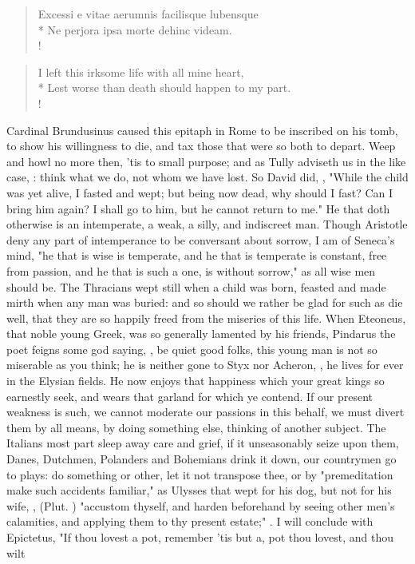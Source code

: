 {\begin{latin}%
\begin{verse}%
Excessi e vitae aerumnis facilisque lubensque\\*
Ne perjora ipsa morte dehinc videam.\\!
\end{verse}%
\end{latin}%
\translationrule%
\begin{verse}%
I left this irksome life with all mine heart,\\*
Lest worse than death should happen to my part.\\!
\end{verse}%

Cardinal Brundusinus caused this epitaph in Rome to be inscribed on his tomb, to show his willingness to die, and tax those that were so both to depart. Weep and howl no more then, 'tis to small purpose; and as Tully adviseth us in the like case, : think what we do, not whom we have lost. So David did, , "While the child was yet alive, I fasted and wept; but being now dead, why should I fast? Can I bring him again? I shall go to him, but he cannot return to me." He that doth otherwise is an intemperate, a weak, a silly, and indiscreet man. Though Aristotle deny any part of intemperance to be conversant about sorrow, I am of Seneca's mind, "he that is wise is temperate, and he that is temperate is constant, free from passion, and he that is such a one, is without sorrow," as all wise men should be. The Thracians wept still when a child was born, feasted and made mirth when any man was buried: and so should we rather be glad for such as die well, that they are so happily freed from the miseries of this life. When Eteoneus, that noble young Greek, was so generally lamented by his friends, Pindarus the poet feigns some god saying, , \etc{} be quiet good folks, this young man is not so miserable as you think; he is neither gone to Styx nor Acheron, , he lives for ever in the Elysian fields. He now enjoys that happiness which your great kings so earnestly seek, and wears that garland for which ye contend. If our present weakness is such, we cannot moderate our passions in this behalf, we must divert them by all means, by doing something else, thinking of another subject. The Italians most part sleep away care and grief, if it unseasonably seize upon them, Danes, Dutchmen, Polanders and Bohemians drink it down, our countrymen go to plays: do something or other, let it not transpose thee, or by "premeditation make such accidents familiar," as Ulysses that wept for his dog, but not for his wife, , (Plut. ) "accustom thyself, and harden beforehand by seeing other men's calamities, and applying them to thy present estate;" . I will conclude with Epictetus, "If thou lovest a pot, remember 'tis but a, pot thou lovest, and thou wilt }
